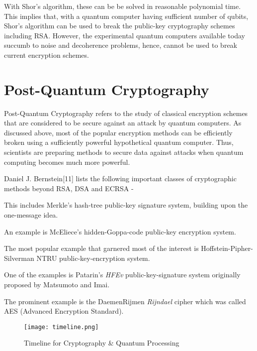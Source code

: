 With Shor's algorithm, these can be be solved in reasonable polynomial time. This implies that, with a quantum computer having sufficient number of qubits, Shor's algorithm can be used to break the public-key cryptography schemes including RSA. However, the experimental quantum computers available today succumb to noise and decoherence problems, hence, cannot be used to break current encryption schemes.

\section{Post-Quantum Cryptography}
Post-Quantum Cryptography refers to the study of classical encryption schemes that are considered to be secure against an attack by quantum computers. As discussed above, most of the popular encryption methods can be efficiently broken using a sufficiently powerful hypothetical quantum computer. Thus, scientists are preparing methods to secure data against attacks when quantum computing becomes much more powerful.

Daniel J. Bernstein[11] lists the following important classes of cryptographic methods beyond RSA, DSA and ECRSA -
\begin{description}[align=left, style=multiline,leftmargin=4 cm]
\item [Hash-based - ] This includes Merkle's hash-tree public-key signature system, building upon the one-message idea.
\item [Code-based - ] An example is McEliece's hidden-Goppa-code public-key encryption system.
\item [Lattice-based - ] The most popular example that garnered most of the interest is Hoffstein-Pipher-Silverman NTRU public-key-encryption system.
\item [Multivariate quadratic equation based- ] One of the examples is Patarin's {\em HFEv} public-key-signature system originally proposed by Matsumoto and Imai.\\
\item [Secret-key based - ] The prominent example is the DaemenRijmen
{\em Rijndael} cipher which was called AES (Advanced Encryption Standard).
\end{description}

\begin{figure}[H]
\centering
\texttt{[image: timeline.png]}
\caption{Timeline for Cryptography \& Quantum Processing}\label{fig:timeline}
\end{figure}


